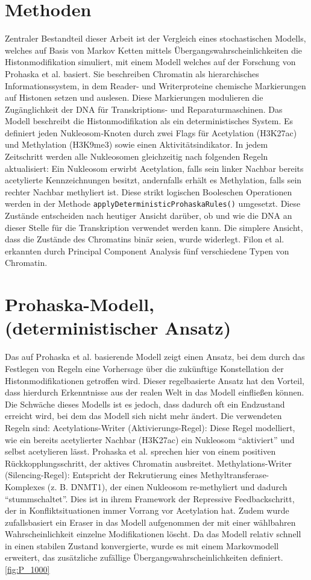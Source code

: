 \documentclass{SeminarV2}
\begin{document}
\section{Methoden}
Zentraler Bestandteil dieser Arbeit ist der Vergleich eines stochastischen Modells, welches auf Basis von Markov Ketten mittels \"{U}bergangswahrscheinlichkeiten die Histonmodifikation simuliert, mit einem Modell welches auf der Forschung von
Prohaska et al. basiert.
Sie beschreiben Chromatin als hierarchisches Informationssystem, in dem Reader- und Writerproteine chemische Markierungen auf Histonen setzen und auslesen. 
Diese Markierungen modulieren die Zugänglichkeit der DNA für Transkriptions- und Reparaturmaschinen.
Das Modell beschreibt die Histonmodifikation als ein deterministisches System.
Es definiert jeden Nukleosom‑Knoten durch zwei Flags für Acetylation (H3K27ac) und Methylation (H3K9me3) sowie einen Aktivitätsindikator. In jedem Zeitschritt werden alle Nukleosomen gleichzeitig nach folgenden Regeln aktualisiert: 
Ein Nukleosom erwirbt Acetylation, falls sein linker Nachbar bereits acetylierte Kennzeichnungen besitzt, andernfalls erhält es Methylation, falls sein rechter Nachbar methy­liert ist. Diese strikt logischen Booleschen Operationen werden in der Methode \texttt{applyDeterministicProhaskaRules()} umgesetzt.
Diese Zustände entscheiden nach heutiger Ansicht darüber, ob und wie die DNA an dieser Stelle für die Transkription verwendet werden kann.
Die simplere Ansicht, dass die Zustände des Chromatins binär seien, wurde widerlegt. Filon et al. erkannten durch Principal Component Analysis fünf verschiedene 
Typen von Chromatin. \cite{filon-2010}

\section{Prohaska-Modell, (deterministischer Ansatz)}
Das auf Prohaska et al. basierende Modell zeigt einen Ansatz, bei dem durch das Festlegen
von Regeln eine Vorhersage über die zukünftige Konstellation der Histonmodifikationen getroffen wird.
Dieser regelbasierte Ansatz hat den Vorteil, dass hierdurch Erkenntnisse aus der realen Welt in das Modell einfließen können.
Die Schwäche dieses Modells ist es jedoch, dass dadurch oft ein Endzustand erreicht wird, bei dem das Modell sich nicht mehr ändert.
Die verwendeten Regeln sind:
Acetylations-Writer (Aktivierungs-Regel):
Diese Regel modelliert, wie ein bereits acetylierter Nachbar (H3K27ac) ein Nukleosom “aktiviert” und selbst acetylieren lässt. Prohaska et al. sprechen hier von einem positiven Rückkopplungsschritt, der aktives Chromatin ausbreitet.
Methylations-Writer (Silencing-Regel):
Entspricht der Rekrutierung eines Methyltransferase-Komplexes (z. B. DNMT1), der einen Nukleosom re-methyliert und dadurch “stummschaltet”. Dies ist in ihrem Framework der Repressive Feedbackschritt, der in Konfliktsituationen immer Vorrang vor Acetylation hat.
Zudem wurde zufallsbasiert ein Eraser in das Modell aufgenommen der mit einer wählbahren Wahrscheinlichkeit einzelne Modifikationen löscht.
Da das Modell relativ schnell in einen stabilen Zustand konvergierte, wurde es mit einem Markovmodell erweitert, das zusätzliche zufällige Übergangswahrscheinlichkeiten definiert. \ref{fig:P_1000}
\end{document}

